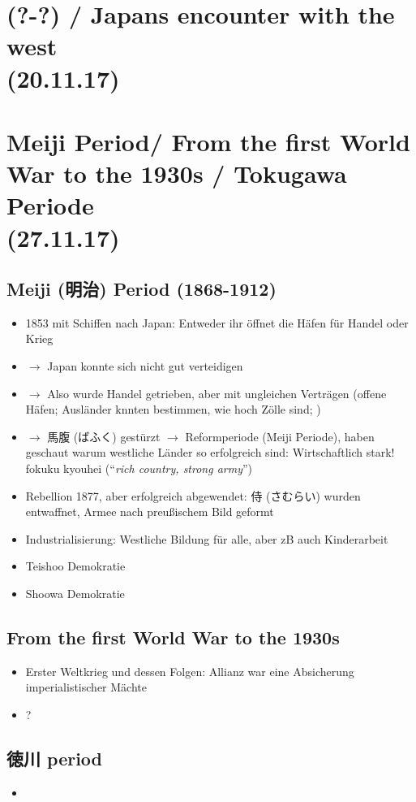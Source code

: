 \documentclass[emulatestandardclasses]{scrartcl}
\begin{document}
\section{(?-?) / Japans encounter with the west\\(20.11.17)}





\section{Meiji Period/ From the first World War to the 1930s / Tokugawa Periode\\(27.11.17)}

\subsection{Meiji (明治) Period (1868-1912)}

\begin{itemize}
  \item 1853 mit Schiffen nach Japan: Entweder ihr öffnet die Häfen für Handel oder Krieg
  \item $\rightarrow$ Japan konnte sich nicht gut verteidigen
  \item $\rightarrow$ Also wurde Handel getrieben, aber mit ungleichen Verträgen (offene Häfen; Ausländer knnten bestimmen, wie hoch Zölle sind; )
  \item $\rightarrow$ 馬腹 (ばふく) gestürzt $\rightarrow$ Reformperiode (Meiji Periode), haben geschaut warum westliche Länder so erfolgreich sind: Wirtschaftlich stark! fokuku kyouhei ("`\emph{rich country, strong army}"')
  \item Rebellion 1877, aber erfolgreich abgewendet: 侍 (さむらい) wurden entwaffnet, Armee nach preußischem Bild geformt
  \item Industrialisierung: Westliche Bildung für alle, aber zB auch Kinderarbeit
\end{itemize}

\begin{itemize}
  \item Teishoo Demokratie
  \item Shoowa Demokratie
\end{itemize}

\subsection{From the first World War to the 1930s}

\begin{itemize}
  \item Erster Weltkrieg und dessen Folgen: Allianz war eine Absicherung imperialistischer Mächte 
  \item ?
\end{itemize}

\subsection{徳川 period}

\begin{itemize}
  \item 
\end{itemize}
\end{document}
